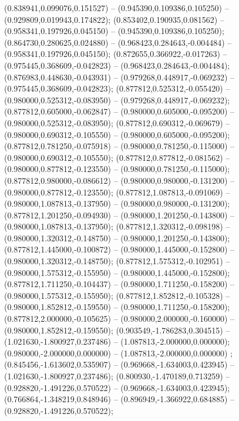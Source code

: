  (0.838941,0.099076,0.151527) -- (0.945390,0.109386,0.105250) -- (0.929809,0.019943,0.174822);
 (0.853402,0.190935,0.081562) -- (0.958341,0.197926,0.045150) -- (0.945390,0.109386,0.105250);
 (0.864730,0.280625,0.024880) -- (0.968423,0.284643,-0.004484) -- (0.958341,0.197926,0.045150);
 (0.872655,0.366922,-0.017263) -- (0.975445,0.368609,-0.042823) -- (0.968423,0.284643,-0.004484);
 (0.876983,0.448630,-0.043931) -- (0.979268,0.448917,-0.069232) -- (0.975445,0.368609,-0.042823);
 (0.877812,0.525312,-0.055420) -- (0.980000,0.525312,-0.083950) -- (0.979268,0.448917,-0.069232);
 (0.877812,0.605000,-0.062847) -- (0.980000,0.605000,-0.095200) -- (0.980000,0.525312,-0.083950);
 (0.877812,0.690312,-0.069679) -- (0.980000,0.690312,-0.105550) -- (0.980000,0.605000,-0.095200);
 (0.877812,0.781250,-0.075918) -- (0.980000,0.781250,-0.115000) -- (0.980000,0.690312,-0.105550);
 (0.877812,0.877812,-0.081562) -- (0.980000,0.877812,-0.123550) -- (0.980000,0.781250,-0.115000);
 (0.877812,0.980000,-0.086612) -- (0.980000,0.980000,-0.131200) -- (0.980000,0.877812,-0.123550);
 (0.877812,1.087813,-0.091069) -- (0.980000,1.087813,-0.137950) -- (0.980000,0.980000,-0.131200);
 (0.877812,1.201250,-0.094930) -- (0.980000,1.201250,-0.143800) -- (0.980000,1.087813,-0.137950);
 (0.877812,1.320312,-0.098198) -- (0.980000,1.320312,-0.148750) -- (0.980000,1.201250,-0.143800);
 (0.877812,1.445000,-0.100872) -- (0.980000,1.445000,-0.152800) -- (0.980000,1.320312,-0.148750);
 (0.877812,1.575312,-0.102951) -- (0.980000,1.575312,-0.155950) -- (0.980000,1.445000,-0.152800);
 (0.877812,1.711250,-0.104437) -- (0.980000,1.711250,-0.158200) -- (0.980000,1.575312,-0.155950);
 (0.877812,1.852812,-0.105328) -- (0.980000,1.852812,-0.159550) -- (0.980000,1.711250,-0.158200);
 (0.877812,2.000000,-0.105625) -- (0.980000,2.000000,-0.160000) -- (0.980000,1.852812,-0.159550);
 (0.903549,-1.786283,0.304515) -- (1.021630,-1.800927,0.237486) -- (1.087813,-2.000000,0.000000);
 (0.980000,-2.000000,0.000000) -- (1.087813,-2.000000,0.000000) ;
 (0.845456,-1.613602,0.535907) -- (0.969668,-1.634003,0.423945) -- (1.021630,-1.800927,0.237486);
 (0.800930,-1.470189,0.713259) -- (0.928820,-1.491226,0.570522) -- (0.969668,-1.634003,0.423945);
 (0.766864,-1.348219,0.848946) -- (0.896949,-1.366922,0.684885) -- (0.928820,-1.491226,0.570522);
